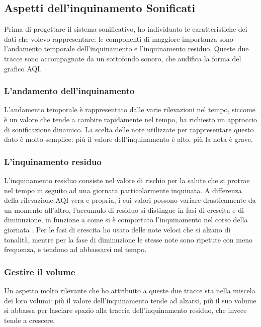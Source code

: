 \subsection{Aspetti dell'inquinamento Sonificati}
Prima di progettare il sistema sonificativo, ho individuato le caratteristiche dei dati che volevo rappresentare:
le componenti di maggiore importanza sono l’andamento temporale dell'inquinamento e l'inquinamento residuo.
Queste due tracce sono accompagnate da un sottofondo sonoro, che audifica la forma del grafico AQI.
\subsubsection{L'andamento dell'inquinamento}
L'andamento temporale è rappresentato dalle varie rilevazioni nel tempo, siccome è un valore che tende a cambire rapidamente nel tempo, ha richiesto un approccio di sonificazione dinamico.
La scelta delle note utilizzate per rappresentare questo dato è molto semplice: più il valore dell'inquinamento è alto, più la nota è grave.
\subsubsection{L'inquinamento residuo}
L'inquinamento residuo consiste nel valore di rischio per la salute che si protrae nel tempo in seguito ad una giornata particolarmente inquinata.
A differenza della rilevazione AQI vera e propria, i cui valori possono variare drasticamente da un momento all'altro, l'accumulo di residuo si distingue in fasi di crescita e di diminuzione, in funzione a come si è comportato l'inquinamento nel corso della giornata \cite{residue}.
Per le fasi di crescita ho usato delle note veloci che si alzano di tonalità, mentre per la fase di diminuzione le stesse note sono ripetute con meno frequenza, e tendono ad abbassarsi nel tempo.
\subsubsection{Gestire il volume}
Un aspetto molto rilevante che ho attribuito a queste due tracce sta nella miscela dei loro volumi: più il valore dell'inquinamento tende ad alzarsi, più il suo volume si abbassa per lasciare spazio alla traccia dell'inquinamento residuo, che invece tende a crescere.
